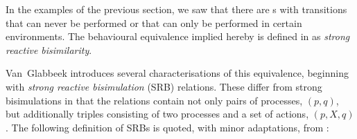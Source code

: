 %
\begin{isabellebody}%
%
%
\isadelimtheory
%
\endisadelimtheory
%
\isatagtheory
%
\endisatagtheory
{\isafoldtheory}%
%
\isadelimtheory
%
\endisadelimtheory
%
\isadelimdocument
%
\endisadelimdocument
%
\isatagdocument
%
\isamarkuptrue%
%
\endisatagdocument
{\isafolddocument}%
%
\isadelimdocument
%
\endisadelimdocument
%
\begin{isamarkuptext}%
\label{sec:reactive_bisimilarity}%
\end{isamarkuptext}\isamarkuptrue%
%
\begin{isamarkuptext}%
In the examples of the previous section, we saw that there are \LTSt{}s with transitions that can never be performed or that can only be performed in certain environments. The behavioural equivalence implied hereby is defined in \cite{rbs} as \emph{strong reactive bisimilarity}.

%
\end{isamarkuptext}\isamarkuptrue%
%
\isadelimdocument
%
\endisadelimdocument
%
\isatagdocument
%
\isamarkuptrue%
%
\endisatagdocument
{\isafolddocument}%
%
\isadelimdocument
%
\endisadelimdocument
%
\begin{isamarkuptext}%
Van~Glabbeek introduces several characterisations of this equivalence, beginning with \emph{strong reactive bisimulation} (SRB) relations. These differ from strong bisimulations in that the relations contain not only pairs of processes, $(p,q)$, but additionally triples consisting of two processes and a set of actions, $(p,X,q)$. The following definition of SRBs is quoted, with minor adaptations, from \cite[definition 1]{rbs}:


\end{isamarkuptext}
\end{isabellebody}
